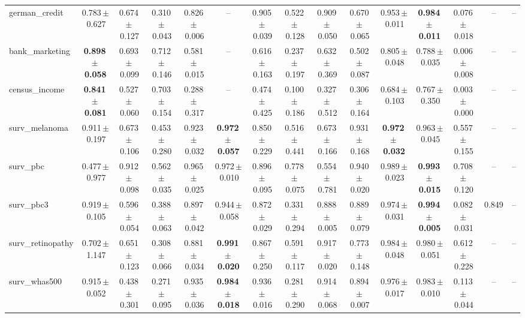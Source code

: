 \documentclass[8pt]{extarticle}
\begin{document}
\begin{longtable}{l*{14}{c}}
german\_credit & 0.783\,$\pm$\,0.627 & 0.674\,$\pm$\,0.127 & 0.310\,$\pm$\,0.043 & 0.826\,$\pm$\,0.006 & -- & 0.905\,$\pm$\,0.039 & 0.522\,$\pm$\,0.128 & 0.909\,$\pm$\,0.050 & 0.670\,$\pm$\,0.065 & 0.953\,$\pm$\,0.011 & \textbf{0.984\,$\pm$\,0.011} & 0.076\,$\pm$\,0.018 & -- & -- \\
bank\_marketing & \textbf{0.898\,$\pm$\,0.058} & 0.693\,$\pm$\,0.099 & 0.712\,$\pm$\,0.146 & 0.581\,$\pm$\,0.015 & -- & 0.616\,$\pm$\,0.163 & 0.237\,$\pm$\,0.197 & 0.632\,$\pm$\,0.369 & 0.502\,$\pm$\,0.087 & 0.805\,$\pm$\,0.048 & 0.788\,$\pm$\,0.035 & 0.006\,$\pm$\,0.008 & -- & -- \\
census\_income & \textbf{0.841\,$\pm$\,0.081} & 0.527\,$\pm$\,0.060 & 0.703\,$\pm$\,0.154 & 0.288\,$\pm$\,0.317 & -- & 0.474\,$\pm$\,0.425 & 0.100\,$\pm$\,0.186 & 0.327\,$\pm$\,0.512 & 0.306\,$\pm$\,0.164 & 0.684\,$\pm$\,0.103 & 0.767\,$\pm$\,0.350 & 0.003\,$\pm$\,0.000 & -- & -- \\
surv\_melanoma & 0.911\,$\pm$\,0.197 & 0.673\,$\pm$\,0.106 & 0.453\,$\pm$\,0.280 & 0.923\,$\pm$\,0.032 & \textbf{0.972\,$\pm$\,0.057} & 0.850\,$\pm$\,0.229 & 0.516\,$\pm$\,0.441 & 0.673\,$\pm$\,0.166 & 0.931\,$\pm$\,0.168 & \textbf{0.972\,$\pm$\,0.032} & 0.963\,$\pm$\,0.045 & 0.557\,$\pm$\,0.155 & -- & -- \\
surv\_pbc & 0.477\,$\pm$\,0.977 & 0.912\,$\pm$\,0.098 & 0.562\,$\pm$\,0.035 & 0.965\,$\pm$\,0.025 & 0.972\,$\pm$\,0.010 & 0.896\,$\pm$\,0.095 & 0.778\,$\pm$\,0.075 & 0.554\,$\pm$\,0.781 & 0.940\,$\pm$\,0.020 & 0.989\,$\pm$\,0.023 & \textbf{0.993\,$\pm$\,0.015} & 0.708\,$\pm$\,0.120 & -- & -- \\
surv\_pbc3 & 0.919\,$\pm$\,0.105 & 0.596\,$\pm$\,0.054 & 0.388\,$\pm$\,0.063 & 0.897\,$\pm$\,0.042 & 0.944\,$\pm$\,0.058 & 0.872\,$\pm$\,0.029 & 0.331\,$\pm$\,0.294 & 0.888\,$\pm$\,0.005 & 0.889\,$\pm$\,0.079 & 0.974\,$\pm$\,0.031 & \textbf{0.994\,$\pm$\,0.005} & 0.082\,$\pm$\,0.031 & 0.849 & -- \\
surv\_retinopathy & 0.702\,$\pm$\,1.147 & 0.651\,$\pm$\,0.123 & 0.308\,$\pm$\,0.066 & 0.881\,$\pm$\,0.034 & \textbf{0.991\,$\pm$\,0.020} & 0.867\,$\pm$\,0.250 & 0.591\,$\pm$\,0.117 & 0.917\,$\pm$\,0.020 & 0.773\,$\pm$\,0.148 & 0.984\,$\pm$\,0.048 & 0.980\,$\pm$\,0.051 & 0.612\,$\pm$\,0.228 & -- & -- \\
surv\_whas500 & 0.915\,$\pm$\,0.052 & 0.438\,$\pm$\,0.301 & 0.271\,$\pm$\,0.095 & 0.935\,$\pm$\,0.036 & \textbf{0.984\,$\pm$\,0.018} & 0.936\,$\pm$\,0.016 & 0.281\,$\pm$\,0.290 & 0.914\,$\pm$\,0.068 & 0.894\,$\pm$\,0.007 & 0.976\,$\pm$\,0.017 & 0.983\,$\pm$\,0.010 & 0.113\,$\pm$\,0.044 & -- & -- \\

\end{longtable}
\end{document}
